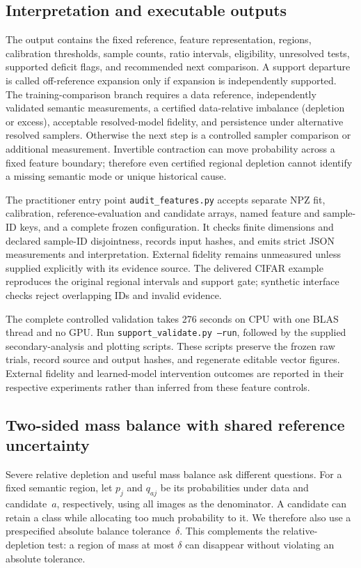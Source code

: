\subsection{Interpretation and executable outputs}
The output contains the fixed reference, feature representation, regions,
calibration thresholds, sample counts, ratio intervals, eligibility, unresolved
tests, supported deficit flags, and recommended next comparison. A support
departure is called off-reference expansion only if expansion is independently
supported. The training-comparison branch requires a data reference,
independently validated semantic measurements, a certified data-relative
imbalance (depletion or excess), acceptable resolved-model fidelity, and persistence under
alternative resolved samplers. Otherwise the next step is a controlled sampler
comparison or additional measurement. Invertible contraction can move probability
across a fixed feature boundary; therefore even certified regional depletion
cannot identify a missing semantic mode or unique historical cause.

The practitioner entry point \texttt{audit\_features.py} accepts separate
NPZ fit, calibration, reference-evaluation and candidate arrays, named feature
and sample-ID keys, and a complete frozen configuration. It checks finite
dimensions and declared sample-ID disjointness, records input hashes, and emits
strict JSON measurements and interpretation. External fidelity remains
unmeasured unless supplied explicitly with its evidence source. The delivered
CIFAR example reproduces the original regional intervals and support gate;
synthetic interface checks reject overlapping IDs and invalid evidence.

The complete controlled validation takes 276 seconds on CPU with one BLAS
thread and no GPU. Run \texttt{support\_validate.py --run}, followed by
the supplied secondary-analysis and plotting scripts. These scripts preserve
the frozen raw trials, record source and output hashes, and regenerate editable
vector figures. External fidelity and learned-model intervention outcomes
are reported in their respective experiments rather than inferred from these
feature controls.

\subsection{Two-sided mass balance with shared reference uncertainty}
\label{sec:support-mass-balance}
Severe relative depletion and useful mass balance ask different questions.
For a fixed semantic region, let $p_j$ and $q_{aj}$ be its probabilities under
data and candidate~$a$, respectively, using all images as the denominator.
A candidate can retain a class while allocating too much probability to it.
We therefore also use a prespecified absolute balance tolerance~$\delta$.
This complements the relative-depletion test: a region of mass at most
$\delta$ can disappear without violating an absolute tolerance.

